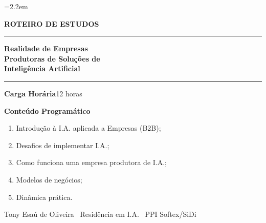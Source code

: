 \documentclass[10pt]{article}
\begin{document}
\color{textcol}
\emergencystretch=2.2em
\sloppy

\thispagestyle{empty}
\begin{center}
\vspace*{1.2cm}

\vspace{0.9cm}

{\displayfont\Large\bfseries\color{accent}ROTEIRO DE ESTUDOS}

\vspace{0.7cm}

{\color{line}\rule{0.75\linewidth}{0.8pt}}

\vspace{0.7cm}

{\displayfont\fontsize{30}{36}\selectfont\bfseries\color{textcol}
Realidade de Empresas\\ Produtoras de Soluções de\\[12pt] \textcolor{accent}{Inteligência Artificial}}

\vspace{0.7cm}

{\color{line}\rule{0.75\linewidth}{0.8pt}}

\vspace{1.1cm}

\begin{tcolorbox}[enhanced,width=0.82\linewidth,colback=panel,colframe=line,
  boxrule=0.8pt,arc=4pt,left=18pt,right=18pt,top=14pt,bottom=14pt,
  borderline west={3pt}{0pt}{accent}]
  {\bfseries\color{accent}Carga Horária}\hspace{0.6em}\color{textcol}12 horas\par
  \vspace{8pt}
  {\bfseries\color{accent}Conteúdo Programático}\par
  \vspace{4pt}
  \color{textcol}
  \begin{enumerate}[leftmargin=1.7em,itemsep=3pt,topsep=2pt]
    \item Introdução à I.A. aplicada a Empresas (B2B);
    \item Desafios de implementar I.A.;
    \item Como funciona uma empresa produtora de I.A.;
    \item Modelos de negócios;
    \item Dinâmica prática.
  \end{enumerate}
\end{tcolorbox}

\vfill
{\footnotesize\color{muted}Tony Esaú de Oliveira \textcolor{line}{\textbar}\ Residência em I.A. \textcolor{line}{\textbar}\ PPI Softex/SiDi}
\vspace{0.6cm}
\end{center}
\end{document}
